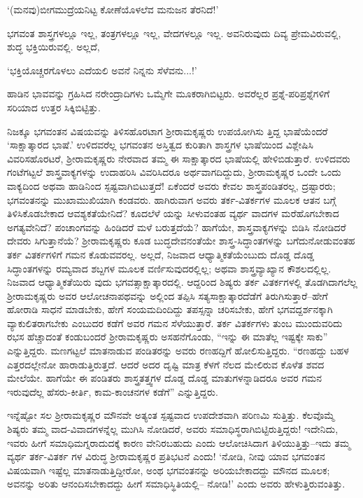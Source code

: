 ‘(ಮನವು)ಬೀಗಮುದ್ರೆಯನಿಟ್ಟ ಕೋಣೆಯೊಳಲೆವ ಮನುಜನ ತೆರನಿದೆ!’ 

ಭಗವಂತ ಶಾಸ್ತ್ರಗಳಲ್ಲೂ ಇಲ್ಲ, ತಂತ್ರಗಳಲ್ಲೂ ಇಲ್ಲ, ವೇದಗಳಲ್ಲೂ ಇಲ್ಲ. ಅವನಿರುವುದು ದಿವ್ಯ ಪ್ರೇಮವಿರುವಲ್ಲಿ, ಶುದ್ಧ ಭಕ್ತಿಯಿರುವಲ್ಲಿ. ಅಲ್ಲದೆ,

‘ಭಕ್ತಿಯೊಚ್ಚರಗೊಳಲು ಎದೆಯಲಿ ಅವನೆ ನಿನ್ನನು ಸೆಳೆವನು...!’

ಹಾಡಿನ ಭಾವವನ್ನು ಗ್ರಹಿಸಿದ ನರೇಂದ್ರಾದಿಗಳು ಒಮ್ಮೆಗೇ ಮೂಕರಾಗಿಬಿಟ್ಟರು. ಅವರೆಲ್ಲರ ಪ್ರಶ್ನೆ-ಪರಿಪ್ರಶ್ನೆಗಳಿಗೆ ಸರಿಯಾದ ಉತ್ತರ ಸಿಕ್ಕಿಬಿಟ್ಟಿತ್ತು.

ನಿಜಕ್ಕೂ ಭಗವಂತನ ವಿಷಯವನ್ನು ತಿಳಿಸಹೊರಟಾಗ ಶ್ರೀರಾಮಕೃಷ್ಣರು ಉಪಯೋಗಿಸು ತ್ತಿದ್ದ ಭಾಷೆಯೆಂದರೆ ‘ಸಾಕ್ಷಾತ್ಕಾರದ ಭಾಷೆ.’ ಉಳಿದವರೆಲ್ಲ ಭಗವಂತನ ಅಸ್ತಿತ್ವದ ಕುರಿತಾಗಿ ಶಾಸ್ತ್ರಗಳ ಭಾಷೆಯಿಂದ ವಿಶ್ಲೇಷಿಸಿ ವಿವರಿಸಹೊರಟರೆ, ಶ್ರೀರಾಮಕೃಷ್ಣರು ನೇರವಾದ ತಮ್ಮ ಈ ಸಾಕ್ಷಾತ್ಕಾರದ ಭಾಷೆಯಲ್ಲಿ ಹೇಳಿಬಿಡುತ್ತಾರೆ. ಉಳಿದವರು ಗಂಟೆಗಟ್ಟಲೆ ಶಾಸ್ತ್ರವಾಕ್ಯಗಳನ್ನು ಉದಾಹರಿಸಿ ವಿವರಿಸಿದರೂ ಅರ್ಥವಾಗದಿದ್ದುದು, ಶ್ರೀರಾಮಕೃಷ್ಣರ ಒಂದೇ ಒಂದು ವಾಕ್ಯದಿಂದ ಅಥವಾ ಹಾಡಿನಿಂದ ಸ್ಪಷ್ಟವಾಗಿಬಿಟುತ್ತದೆ! ಏಕೆಂದರೆ ಅವರು ಕೇವಲ ಶಾಸ್ತ್ರಪಂಡಿತರಲ್ಲ, ದ್ರಷ್ಟಾರರು; ಭಗವಂತನನ್ನು ಮುಖಾಮುಖಿಯಾಗಿ ಕಂಡವರು. ಹಾಗಿರುವಾಗ ಅವರು ತರ್ಕ-ವಿತರ್ಕಗಳ ಮೂಲಕ ಆತನ ಬಗ್ಗೆ ತಿಳಿಸಿಕೊಡಬೇಕಾದ ಆವಶ್ಯಕತೆಯೇನಿದೆ? ಕೂದಲೆಳೆ ಯನ್ನು ಸೀಳುವಂತಹ ವ್ಯರ್ಥ ವಾದಗಳ ಮರೆಹೊಗಬೇಕಾದ ಅಗತ್ಯವೇನಿದೆ? ಪಂಚಾಂಗವನ್ನು ಹಿಂಡಿದರೆ ಮಳೆ ಬರುತ್ತದೆಯೆ? ಹಾಗೆಯೇ, ಶಾಸ್ತ್ರವಾಕ್ಯಗಳನ್ನು ಬಿಡಿಸಿ ನೋಡಿದರೆ ದೇವರು ಸಿಗುತ್ತಾನೆಯೆ? ಶ್ರೀರಾಮಕೃಷ್ಣರು ಕೂಡ ಬುದ್ಧದೇವನಂತೆಯೇ ಶಾಸ್ತ್ರ-ಸಿದ್ಧಾಂತಗಳನ್ನು ಬಗೆದುನೋಡುವಂತಹ ತರ್ಕ ವಿತರ್ಕಗಳಿಗೆ ಗಮನ ಕೊಡುವವರಲ್ಲ. ಅಲ್ಲದೆ, ನಿಜವಾದ ಆಧ್ಯಾತ್ಮಿಕತೆಯೆಂಬುದು ದೊಡ್ಡ ದೊಡ್ಡ ಸಿದ್ಧಾಂತಗಳನ್ನು ರಮ್ಯವಾದ ಶಬ್ದಗಳ ಮೂಲಕ ವರ್ಣಿಸುವುದರಲ್ಲಿಲ್ಲ; ಅಥವಾ ಶಾಸ್ತ್ರವ್ಯಾಖ್ಯಾನ ಕೌಶಲದಲ್ಲಿಲ್ಲ. ನಿಜವಾದ ಆಧ್ಯಾತ್ಮಿಕತೆಯಿರು ವುದು ಭಗವತ್ಸಾಕ್ಷಾತ್ಕಾರದಲ್ಲಿ. ಆದ್ದರಿಂದ ಶಿಷ್ಯರು ತರ್ಕ ವಿತರ್ಕಗಳಲ್ಲಿ ತೊಡಗಿದಾಗಲೆಲ್ಲ ಶ್ರೀರಾಮಕೃಷ್ಣರು ಅವರ ಆಲೋಚನಾಪಥವನ್ನು ಅಲ್ಲಿಂದ ತಪ್ಪಿಸಿ ಸತ್ಯಸಾಕ್ಷಾತ್ಕಾರದೆಡೆಗೆ ತಿರುಗಿಸುತ್ತಾರೆ–ಹೇಗೆ ಹೋರಾಡಿ ಸಾಧನೆ ಮಾಡಬೇಕು, ಹೇಗೆ ಸಂಯಮದಿಂದಿದ್ದು ತಪಸ್ಸನ್ನಾ ಚರಿಸಬೇಕು, ಹೇಗೆ ಭಗವದ್ದರ್ಶನಕ್ಕಾಗಿ ವ್ಯಾಕುಲಿತರಾಗಬೇಕು ಎಂಬುದರ ಕಡೆಗೆ ಅವರ ಗಮನ ಸೆಳೆಯುತ್ತಾರೆ. ತರ್ಕ ವಿತರ್ಕಗಳು ತುಂಬ ಮುಂದುವರಿದು ರಭಸ ಹೆಚ್ಚಾದಂತೆ ಕಂಡುಬಂದರೆ ಶ್ರೀರಾಮಕೃಷ್ಣರು ಅಸಹನೆಗೊಂಡು, “ಇನ್ನು ಈ ಮಾತೆಲ್ಲ ಇಷ್ಟಕ್ಕೇ ಸಾಕು” ಎನ್ನುತ್ತಿದ್ದರು. ಮಣಗಟ್ಟಲೆ ಮಾತನಾಡುವ ಪಂಡಿತರನ್ನು ಅವರು ರಣಹದ್ದಿಗೆ ಹೋಲಿಸುತ್ತಿದ್ದರು. “ರಣಹದ್ದು ಬಹಳ ಎತ್ತರದಲ್ಲೇನೋ ಹಾರಾಡುತ್ತಿರುತ್ತದೆ. ಆದರೆ ಅದರ ದೃಷ್ಟಿ ಮಾತ್ರ ಕೆಳಗೆ ನೆಲದ ಮೇಲಿರುವ ಕೊಳೆತ ಶವದ ಮೇಲೆಯೇ. ಹಾಗೆಯೇ ಈ ಪಂಡಿತರು ಶಾಸ್ತ್ರತತ್ತ್ವಗಳ ದೊಡ್ಡ ದೊಡ್ಡ ಮಾತುಗಳನ್ನಾಡಿದರೂ ಅವರ ಗಮನ ಇರುವುದೆಲ್ಲ ಹೆಸರು-ಕೀರ್ತಿ, ಕಾಮ-ಕಾಂಚನಗಳ ಕಡೆಗೆ” ಎನ್ನುತ್ತಿದ್ದರು.

ಇನ್ನೆಷ್ಟೋ ಸಲ ಶ್ರೀರಾಮಕೃಷ್ಣರ ಮೌನವೇ ಅತ್ಯಂತ ಸ್ಪಷ್ಟವಾದ ಉಪದೇಶವಾಗಿ ಪರಿಣಮಿ ಸುತ್ತಿತ್ತು. ಕೆಲವೊಮ್ಮೆ ಶಿಷ್ಯರು ತಮ್ಮ ವಾದ-ವಿವಾದಗಳನ್ನೆಲ್ಲ ಮುಗಿಸಿ ನೋಡಿದರೆ, ಅವರು ಸಮಾಧಿಸ್ಥರಾಗಿಬಿಟ್ಟಿರುತ್ತಿದ್ದರು! ಇದೇನಿದು, ಇವರು ಹೀಗೆ ಸಮಾಧಿಮಗ್ನರಾದುದಕ್ಕೆ ಕಾರಣ ವೇನಿರಬಹುದು ಎಂದು ಆಲೋಚಿಸಿದಾಗ ತಿಳಿಯುತ್ತಿತ್ತು–ಇದು ತಮ್ಮ ವ್ಯರ್ಥ ತರ್ಕ-ವಿತರ್ಕ ಗಳ ವಿರುದ್ಧ ಶ್ರೀರಾಮಕೃಷ್ಣರ ಪ್ರತಿಭಟನೆ ಎಂದು! ‘ನೋಡಿ, ನೀವು ಯಾವ ಭಗವಂತನ ವಿಷಯವಾಗಿ ಇಷ್ಟೆಲ್ಲ ಮಾತನಾಡುತ್ತಿದ್ದೀರೋ, ಅಂಥ ಭಗವಂತನನ್ನು ಅರಿಯಬೇಕಾದದ್ದು ಮೌನದ ಮೂಲಕ; ಅವನನ್ನು ಅರಿತು ಆನಂದಿಸಬೇಕಾದದ್ದು ಹೀಗೆ ಸಮಾಧಿಸ್ಥಿತಿಯಲ್ಲಿ– ನೋಡಿ!’ ಎಂದು ಅವರು ಹೇಳುತ್ತಿರುವಂತಿತ್ತು.

